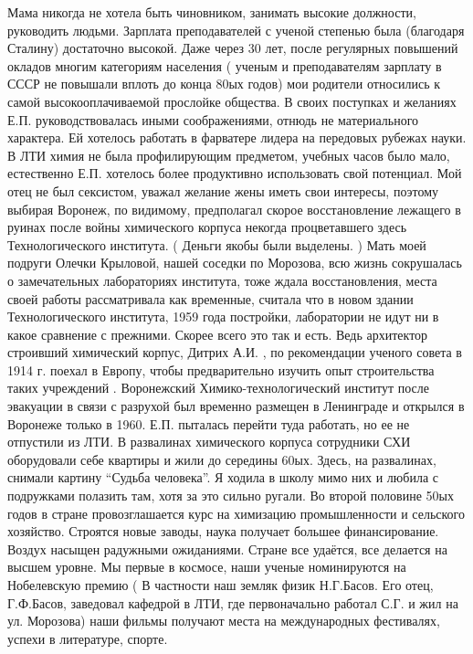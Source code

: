 Мама никогда не хотела быть чиновником, занимать высокие должности, руководить людьми. Зарплата преподавателей с ученой степенью была (благодаря Сталину) достаточно высокой. Даже через 30 лет, после регулярных повышений окладов многим категориям населения ( ученым и преподавателям зарплату в СССР не повышали вплоть до конца 80ых годов) мои родители относились к самой высокооплачиваемой прослойке общества. В своих поступках и желаниях Е.П. руководствовалась иными соображениями, отнюдь не материального характера. Ей хотелось работать в фарватере лидера на передовых рубежах науки. В ЛТИ химия не была профилирующим предметом, учебных часов было мало, естественно Е.П. хотелось более продуктивно использовать свой потенциал. Мой отец не был сексистом, уважал желание жены иметь свои интересы, поэтому выбирая Воронеж, по видимому, предполагал скорое восстановление лежащего в руинах после войны химического корпуса некогда процветавшего здесь Технологического института. ( Деньги якобы  были выделены. ) Мать моей подруги Олечки Крыловой, нашей соседки по  Морозова, всю жизнь сокрушалась о замечательных лабораториях института, тоже ждала восстановления, места своей работы рассматривала как временные, считала что в новом здании Технологического института, 1959 года постройки, лаборатории не идут ни в какое сравнение с прежними. Скорее всего это так и есть. Ведь архитектор строивший химический корпус, Дитрих А.И. , по рекомендации ученого совета в 1914 г. поехал в Европу, чтобы предварительно изучить опыт строительства  таких учреждений . Воронежский Химико-технологический институт после эвакуации в связи с разрухой был временно размещен в Ленинграде и открылся  в Воронеже только в 1960. Е.П. пыталась перейти туда работать, но ее не отпустили из ЛТИ.
В развалинах химического корпуса сотрудники СХИ оборудовали себе квартиры и жили до середины 60ых. Здесь, на развалинах, снимали картину “Судьба человека”. Я ходила в школу мимо них и любила с подружками полазить там, хотя за это сильно ругали.
Во второй половине 50ых годов в стране провозглашается курс на химизацию промышленности и сельского хозяйство. Строятся новые заводы, наука получает большее финансирование. Воздух насыщен радужными ожиданиями. Стране все удаётся, все делается на высшем уровне. Мы первые в космосе, наши ученые номинируются на Нобелевскую премию ( В частности наш земляк физик Н.Г.Басов. Его отец, Г.Ф.Басов, заведовал кафедрой в ЛТИ, где первоначально работал С.Г. и жил на ул. Морозова) наши фильмы получают места на международных фестивалях, успехи в литературе, спорте.
